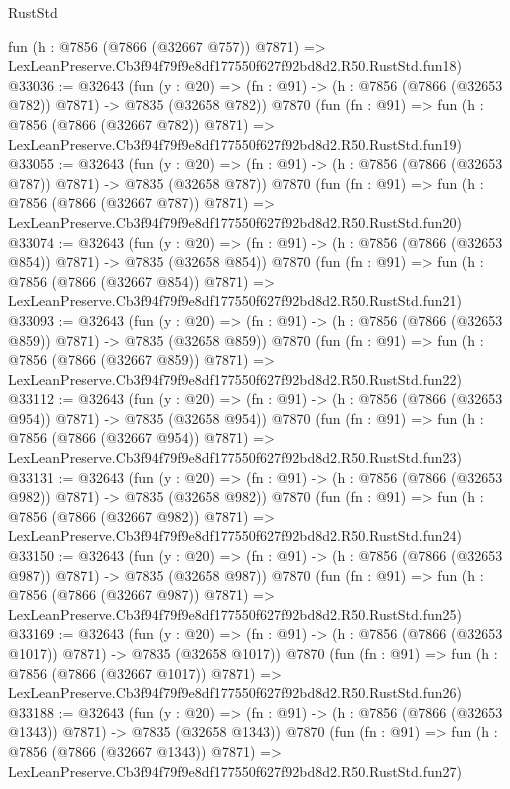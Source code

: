 \begin{lexlean}{RustStd}
\begin{coremodule}
    fun (h : @7856 (@7866 (@32667 @757)) @7871) =>
    LexLeanPreserve.Cb3f94f79f9e8df177550f627f92bd8d2.R50.RustStd.fun18)
@33036 := @32643
    (fun (y : @20) => (fn : @91) -> (h : @7856 (@7866 (@32653 @782)) @7871) -> @7835 (@32658 @782))
    @7870
    (fun (fn : @91) =>
    fun (h : @7856 (@7866 (@32667 @782)) @7871) =>
    LexLeanPreserve.Cb3f94f79f9e8df177550f627f92bd8d2.R50.RustStd.fun19)
@33055 := @32643
    (fun (y : @20) => (fn : @91) -> (h : @7856 (@7866 (@32653 @787)) @7871) -> @7835 (@32658 @787))
    @7870
    (fun (fn : @91) =>
    fun (h : @7856 (@7866 (@32667 @787)) @7871) =>
    LexLeanPreserve.Cb3f94f79f9e8df177550f627f92bd8d2.R50.RustStd.fun20)
@33074 := @32643
    (fun (y : @20) => (fn : @91) -> (h : @7856 (@7866 (@32653 @854)) @7871) -> @7835 (@32658 @854))
    @7870
    (fun (fn : @91) =>
    fun (h : @7856 (@7866 (@32667 @854)) @7871) =>
    LexLeanPreserve.Cb3f94f79f9e8df177550f627f92bd8d2.R50.RustStd.fun21)
@33093 := @32643
    (fun (y : @20) => (fn : @91) -> (h : @7856 (@7866 (@32653 @859)) @7871) -> @7835 (@32658 @859))
    @7870
    (fun (fn : @91) =>
    fun (h : @7856 (@7866 (@32667 @859)) @7871) =>
    LexLeanPreserve.Cb3f94f79f9e8df177550f627f92bd8d2.R50.RustStd.fun22)
@33112 := @32643
    (fun (y : @20) => (fn : @91) -> (h : @7856 (@7866 (@32653 @954)) @7871) -> @7835 (@32658 @954))
    @7870
    (fun (fn : @91) =>
    fun (h : @7856 (@7866 (@32667 @954)) @7871) =>
    LexLeanPreserve.Cb3f94f79f9e8df177550f627f92bd8d2.R50.RustStd.fun23)
@33131 := @32643
    (fun (y : @20) => (fn : @91) -> (h : @7856 (@7866 (@32653 @982)) @7871) -> @7835 (@32658 @982))
    @7870
    (fun (fn : @91) =>
    fun (h : @7856 (@7866 (@32667 @982)) @7871) =>
    LexLeanPreserve.Cb3f94f79f9e8df177550f627f92bd8d2.R50.RustStd.fun24)
@33150 := @32643
    (fun (y : @20) => (fn : @91) -> (h : @7856 (@7866 (@32653 @987)) @7871) -> @7835 (@32658 @987))
    @7870
    (fun (fn : @91) =>
    fun (h : @7856 (@7866 (@32667 @987)) @7871) =>
    LexLeanPreserve.Cb3f94f79f9e8df177550f627f92bd8d2.R50.RustStd.fun25)
@33169 := @32643
    (fun (y : @20) =>
    (fn : @91) -> (h : @7856 (@7866 (@32653 @1017)) @7871) -> @7835 (@32658 @1017))
    @7870
    (fun (fn : @91) =>
    fun (h : @7856 (@7866 (@32667 @1017)) @7871) =>
    LexLeanPreserve.Cb3f94f79f9e8df177550f627f92bd8d2.R50.RustStd.fun26)
@33188 := @32643
    (fun (y : @20) =>
    (fn : @91) -> (h : @7856 (@7866 (@32653 @1343)) @7871) -> @7835 (@32658 @1343))
    @7870
    (fun (fn : @91) =>
    fun (h : @7856 (@7866 (@32667 @1343)) @7871) =>
    LexLeanPreserve.Cb3f94f79f9e8df177550f627f92bd8d2.R50.RustStd.fun27)

\end{coremodule}
\end{lexlean}
